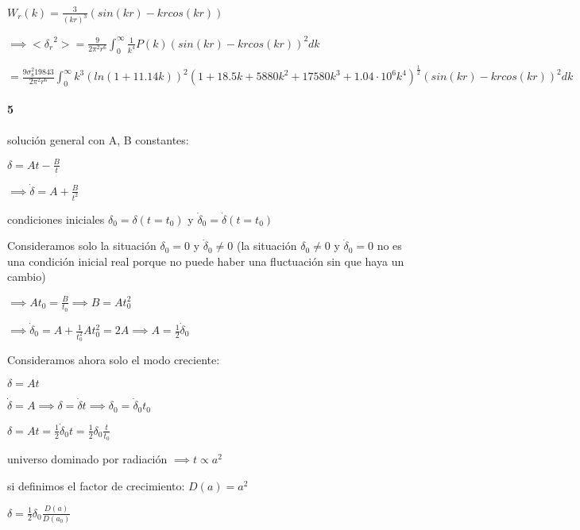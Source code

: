 \documentclass[12pt]{book}
\begin{document}
$W_r(k) = \frac{3}{(kr)^3}(sin(kr) - kr cos(kr))$ 

$\implies <{\delta_r}^2> = \frac{9 }{2\pi^2 r^6}\int_0^\infty{\frac{1}{k^4} P(k)(sin(kr) - k r cos(kr))^2 dk }$

$= \frac{9 \sigma_8^2 19843}{2\pi^2 r^6}\int_0^\infty{k^3(ln(1+11.14k))^2 
(1+18.5k + 5880k^2+17580k^3 + 1.04 \cdot 10^6 k^4)^{\frac{1}{2}}(sin(kr) - k r cos(kr))^2 dk }$

\paragraph{5}

solución general con A, B constantes:

$\delta = A t - \frac{B}{t}$

$\implies \dot \delta = A + \frac{B}{t^2}$

condiciones iniciales $\delta_0=\delta(t=t_0) $ y $\dot\delta_0 = \dot\delta(t=t_0)$

Consideramos solo la situación $\delta_0 = 0$ y $\dot\delta_0 \neq 0$ (la situación $\delta_0 \neq 0$ y $\dot\delta_0 = 0$ 
no es una condición inicial real porque no puede haber una fluctuación sin que haya un cambio)

$\implies A t_0 = \frac{B}{t_0} \implies B = A t_0^2$

$\implies \dot\delta_0 = A + \frac{1}{t_0^2} A t_0^2 = 2 A \implies A = \frac{1}{2} \dot\delta_0$

Consideramos ahora solo el modo creciente:

$\delta = A t$

$\dot \delta = A \implies \delta = \dot\delta t \implies \delta_0 = \dot\delta_0 t_0$

$\delta = A t= \frac{1}{2} \dot\delta_0 t= \frac{1}{2}\delta_0 \frac{t}{t_0}$

universo dominado por radiación $\implies t \propto a^2$

si definimos el factor de crecimiento: $D(a) = a^2$
 
$\delta = \frac{1}{2} \delta_{0} \frac{D(a)}{D(a_{0})} $ 
\end{document}

